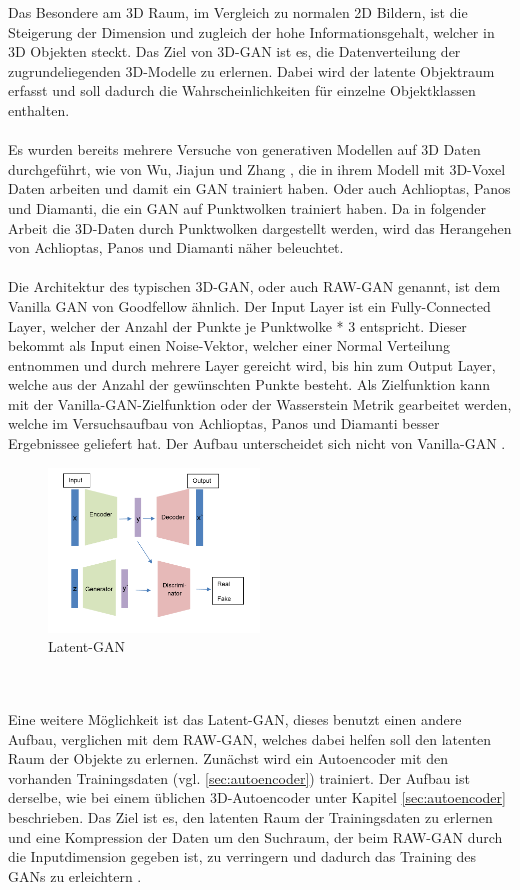 \documentclass{llncs}
\begin{document}
Das Besondere am 3D Raum, im Vergleich zu normalen 2D Bildern, ist die Steigerung der Dimension und zugleich der hohe Informationsgehalt, welcher in 3D Objekten steckt. Das Ziel von 3D-GAN ist es, die Datenverteilung der zugrundeliegenden 3D-Modelle zu erlernen. Dabei wird der latente Objektraum erfasst und soll dadurch die Wahrscheinlichkeiten für einzelne Objektklassen enthalten. 
\\\\
Es wurden bereits mehrere Versuche von generativen Modellen auf 3D Daten durchgeführt, wie von Wu, Jiajun und Zhang \cite{3d}, die in ihrem Modell mit 3D-Voxel Daten arbeiten und damit ein GAN trainiert haben. Oder auch Achlioptas, Panos und Diamanti\cite{3dgan}, die ein GAN auf Punktwolken trainiert haben. Da in folgender Arbeit die 3D-Daten durch Punktwolken dargestellt werden, wird das Herangehen von Achlioptas, Panos und Diamanti näher beleuchtet.
\\\\
Die Architektur des typischen 3D-GAN, oder auch RAW-GAN genannt, ist dem Vanilla GAN von Goodfellow ähnlich. Der Input Layer ist ein Fully-Connected Layer, welcher der Anzahl der Punkte je Punktwolke * 3 entspricht. Dieser bekommt als Input einen Noise-Vektor, welcher einer Normal Verteilung entnommen und durch mehrere Layer gereicht wird, bis hin zum Output Layer, welche aus der Anzahl der gewünschten Punkte besteht. Als Zielfunktion kann mit der Vanilla-GAN-Zielfunktion oder der Wasserstein Metrik gearbeitet werden, welche im Versuchsaufbau von Achlioptas, Panos und Diamanti besser Ergebnissee geliefert hat. Der Aufbau unterscheidet sich nicht von Vanilla-GAN \cite{3dgan}. 
\begin{figure}[htbp] 
	\centering
	\includegraphics[width=0.5\textwidth]{latentgan.png}
	\caption{Latent-GAN}
	\label{fig:Bild39}
\end{figure}
~\\\\
Eine weitere Möglichkeit ist das Latent-GAN, dieses benutzt einen andere Aufbau, verglichen mit dem RAW-GAN, welches dabei helfen soll den latenten Raum der Objekte zu erlernen. Zunächst wird ein Autoencoder mit den vorhanden Trainingsdaten (vgl. \ref{sec:autoencoder}) trainiert. Der Aufbau ist derselbe, wie bei einem üblichen 3D-Autoencoder unter Kapitel \ref{sec:autoencoder} beschrieben. Das Ziel ist es, den latenten Raum der Trainingsdaten zu erlernen und eine Kompression der Daten um den Suchraum, der beim RAW-GAN durch die Inputdimension gegeben ist, zu verringern und dadurch das Training des GANs zu erleichtern \cite{3dgan}. 
\end{document}
